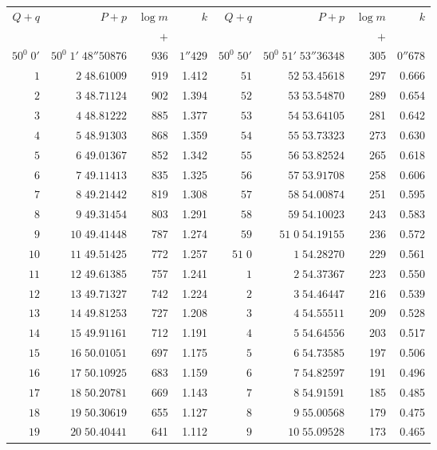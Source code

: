 \clearpage
{}
\begingroup
\fontsize{8}{9}\selectfont
\setlength{\tabcolsep}{3pt}
\renewcommand{\arraystretch}{1.08}
\begin{center}
\begin{tabular}{|r|r|r|r||r|r|r|r|}
\hline
\(Q+q\)&\(P+p\)&\(\log m\)&\(k\)&\(Q+q\)&\(P+p\)&\(\log m\)&\(k\)\\
&&\(+\)&&&&\(+\)&\\\hline
\(50^0\;0'\)&\(50^0\;1'\;48''50876\)&936&\(1''429\)&\(50^0\;50'\)&\(50^0\;51'\;53''36348\)&305&\(0''678\)\\
\(1\)&\(2\;48.61009\)&919&1.412&\(51\)&\(52\;53.45618\)&297&0.666\\
\(2\)&\(3\;48.71124\)&902&1.394&\(52\)&\(53\;53.54870\)&289&0.654\\
\(3\)&\(4\;48.81222\)&885&1.377&\(53\)&\(54\;53.64105\)&281&0.642\\
\(4\)&\(5\;48.91303\)&868&1.359&\(54\)&\(55\;53.73323\)&273&0.630\\
\(5\)&\(6\;49.01367\)&852&1.342&\(55\)&\(56\;53.82524\)&265&0.618\\
\(6\)&\(7\;49.11413\)&835&1.325&\(56\)&\(57\;53.91708\)&258&0.606\\
\(7\)&\(8\;49.21442\)&819&1.308&\(57\)&\(58\;54.00874\)&251&0.595\\
\(8\)&\(9\;49.31454\)&803&1.291&\(58\)&\(59\;54.10023\)&243&0.583\\
\(9\)&\(10\;49.41448\)&787&1.274&\(59\)&\(51\;0\;54.19155\)&236&0.572\\[3pt]
\(10\)&\(11\;49.51425\)&772&1.257&\(51\;0\)&\(1\;54.28270\)&229&0.561\\
\(11\)&\(12\;49.61385\)&757&1.241&\(1\)&\(2\;54.37367\)&223&0.550\\
\(12\)&\(13\;49.71327\)&742&1.224&\(2\)&\(3\;54.46447\)&216&0.539\\
\(13\)&\(14\;49.81253\)&727&1.208&\(3\)&\(4\;54.55511\)&209&0.528\\
\(14\)&\(15\;49.91161\)&712&1.191&\(4\)&\(5\;54.64556\)&203&0.517\\
\(15\)&\(16\;50.01051\)&697&1.175&\(5\)&\(6\;54.73585\)&197&0.506\\
\(16\)&\(17\;50.10925\)&683&1.159&\(6\)&\(7\;54.82597\)&191&0.496\\
\(17\)&\(18\;50.20781\)&669&1.143&\(7\)&\(8\;54.91591\)&185&0.485\\
\(18\)&\(19\;50.30619\)&655&1.127&\(8\)&\(9\;55.00568\)&179&0.475\\
\(19\)&\(20\;50.40441\)&641&1.112&\(9\)&\(10\;55.09528\)&173&0.465\\[3pt]

\end{tabular}
\end{center}
